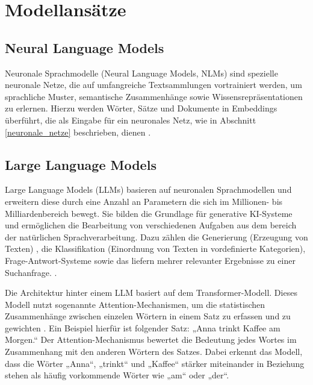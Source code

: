 \section {Modellansätze}
\label{sec:modellansätze}

\subsection{Neural Language Models}
\label{sec:neural_language_models}

Neuronale Sprachmodelle (Neural Language Models, NLMs) sind spezielle neuronale Netze, die auf umfangreiche Textsammlungen vortrainiert werden, um sprachliche Muster, semantische Zusammenhänge sowie Wissensrepräsentationen zu erlernen.
Hierzu werden Wörter, Sätze und Dokumente in Embeddings überführt, die als Eingabe für ein neuronales Netz, wie in Abschnitt \ref{neuronale_netze} beschrieben, dienen \parencite{LeCun2015}.

\subsection{Large Language Models }
\label{sec:large_language_models}

Large Language Models (LLMs) basieren auf neuronalen Sprachmodellen und erweitern diese durch eine Anzahl an Parametern die sich im Millionen- bis Milliardenbereich bewegt.
Sie bilden die Grundlage für generative KI-Systeme und ermöglichen die Bearbeitung von verschiedenen Aufgaben aus dem bereich der natürlichen Sprachverarbeitung.
Dazu zählen die Generierung (Erzeugung von Texten) , die Klassifikation (Einordnung von Texten in vordefinierte Kategorien), Frage-Antwort-Systeme sowie das liefern mehrer relevanter Ergebnisse zu einer Suchanfrage. \parencite{Zhao2023}.

Die Architektur hinter einem LLM basiert auf dem Transformer-Modell. Dieses Modell nutzt sogenannte Attention-Mechanismen, um die statistischen Zusammenhänge zwischen einzelen Wörtern in einem Satz zu erfassen und zu gewichten \parencite{Vaswani2017}. 
Ein Beispiel hierfür ist folgender Satz: „Anna trinkt Kaffee am Morgen.“ Der Attention-Mechanismus bewertet die Bedeutung jedes Wortes im Zusammenhang mit den anderen Wörtern des Satzes. 
Dabei erkennt das Modell, dass die Wörter „Anna“, „trinkt“ und „Kaffee“ stärker miteinander in Beziehung stehen als häufig vorkommende Wörter wie „am“ oder „der“. 

